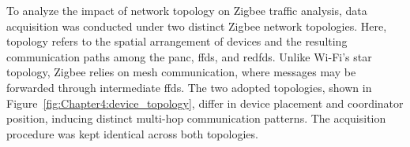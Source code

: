 To analyze the impact of network topology on Zigbee traffic analysis, data acquisition was conducted under two distinct Zigbee network topologies. Here, topology refers to the spatial arrangement of devices and the resulting communication paths among the \gls*{panc}, \glspl*{ffd}, and \glspl*{redfd}. Unlike Wi-Fi’s star topology, Zigbee relies on mesh communication, where messages may be forwarded through intermediate \glspl*{ffd}. The two adopted topologies, shown in Figure~\ref{fig:Chapter4:device_topology}, differ in device placement and coordinator position, inducing distinct multi-hop communication patterns. The acquisition procedure was kept identical across both topologies.

